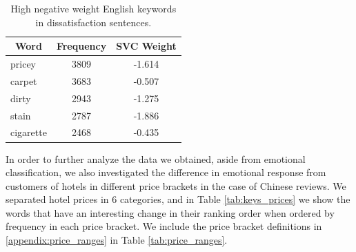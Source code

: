\documentclass[review]{elsarticle}
\begin{document}
\begin{table}[bp]
\centering
\caption{High negative weight English keywords in dissatisfaction sentences.}
\label{tab:neg_keys_en}
\begin{tabular}{|l|c|c|}
\hline
\multicolumn{1}{|c|}{\textbf{Word}} & \textbf{Frequency} & \textbf{SVC Weight} \\ \hline
pricey & 3809 & -1.614 \\ \hline
carpet & 3683 & -0.507 \\ \hline
dirty & 2943 & -1.275 \\ \hline
stain & 2787 & -1.886 \\ \hline
cigarette & 2468 & -0.435 \\ \hline
\end{tabular}
\end{table}

In order to further analyze the data we obtained, aside from emotional classification, we also investigated the difference in emotional response from customers of hotels in different price brackets in the case of Chinese reviews. We separated hotel prices in 6 categories, and in Table \ref{tab:keys_prices} we show the words that have an interesting change in their ranking order when ordered by frequency in each price bracket. We include the price bracket definitions in \ref{appendix:price_ranges} in Table \ref{tab:price_ranges}.
\end{document}
